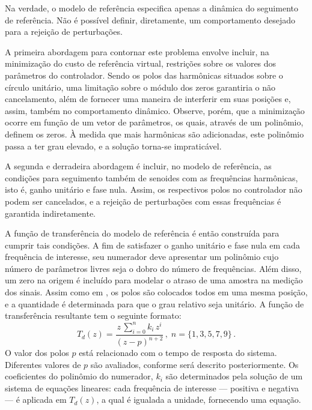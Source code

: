 \documentclass[repeatfields,oneside,overleaf]{tcc}
\newcommand{\mycdot}{ \, }
\begin{document}
Na verdade, o modelo de referência especifica apenas a dinâmica do seguimento de referência.
Não é possível definir, diretamente, um comportamento desejado para a rejeição de perturbações.

A primeira abordagem para contornar este problema envolve incluir, na minimização do custo de referência virtual, restrições sobre os valores dos parâmetros do controlador.
Sendo os polos das harmônicas situados sobre o círculo unitário, uma limitação sobre o módulo dos zeros garantiria o não cancelamento, além de fornecer uma maneira de interferir em suas posições e, assim, também no comportamento dinâmico.
Observe, porém, que a minimização ocorre em função de um vetor de parâmetros, os quais, através de um polinômio, definem os zeros.
À medida que mais harmônicas são adicionadas, este polinômio passa a ter grau elevado, e a solução torna-se impraticável.

A segunda e derradeira abordagem é incluir, no modelo de referência, as condições para seguimento também de senoides com as frequências harmônicas, isto é, ganho unitário e fase nula.
Assim, os respectivos polos no controlador não podem ser cancelados, e a rejeição de perturbações com essas frequências é garantida indiretamente.

A função de transferência do modelo de referência é então construída para cumprir tais condições.
A fim de satisfazer o ganho unitário e fase nula em cada frequência de interesse, seu numerador deve apresentar um polinômio cujo número de parâmetros livres seja o dobro do número de frequências.
Além disso, um zero na origem é incluído para modelar o atraso de uma amostra na medição dos sinais.
Assim como em \textcite{Corleta2015, Bruna2020}, os polos são colocados todos em uma mesma posição, e a quantidade é determinada para que o grau relativo seja unitário.
A função de transferência resultante tem o seguinte formato:
\begin{equation} \label{eq:mr}
    T_d(z) = \dfrac{ z \mycdot \sum_{i = 0}^{n} k_i \mycdot z^i  }{ \left( z - p \right)^{n + 2} }
    \,,\;
    n = \{1, 3, 5, 7, 9\}
    \,.
\end{equation}
O valor dos polos $p$ está relacionado com o tempo de resposta do sistema.
Diferentes valores de $p$ são avaliados, conforme será descrito posteriormente.
Os coeficientes do polinômio do numerador, $k_i$ são determinados pela solução de um sistema de equações lineares:
cada frequência de interesse --- positiva e negativa --- é aplicada em $T_d(z)$, a qual é igualada a unidade, fornecendo uma equação.
\end{document}
